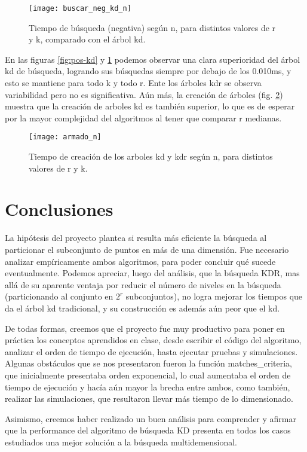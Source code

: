 \begin{figure}
  \begin{center}
  \texttt{[image: buscar\_neg\_kd\_n]}
  \caption{Tiempo de búsqueda (negativa)
    según n, para distintos valores de r y k, comparado con el árbol kd.}
  \label{fig:neg-kd}
  \end{center}
\end{figure}


En las figuras \ref{fig:pos-kd} y \ref{fig:neg-kd} podemos observar
una clara superioridad del árbol kd de búsqueda, logrando sus
búsquedas siempre por debajo de los 0.010ms, y esto se mantiene para
todo k y todo r. Ente los árboles kdr se observa variabilidad pero no
es significativa. Aún más, la creación de árboles
(fig. \ref{fig:armado}) muestra que la creación de arboles kd es
también superior, lo que es de esperar por la mayor complejidad del
algoritmos al tener que comparar r medianas.


\begin{figure}
  \begin{center}
  \texttt{[image: armado\_n]}
  \caption{Tiempo de creación de los arboles kd y kdr
    según n, para distintos valores de r y k.}
  \label{fig:armado}
  \end{center}
\end{figure}

\section{Conclusiones}
La hipótesis del proyecto plantea si resulta más eficiente la
búsqueda al particionar el subconjunto de puntos en más de una
dimensión.
Fue necesario analizar empíricamente ambos algoritmos, para poder
concluir qué sucede eventualmente.
Podemos apreciar, luego del análisis, que la búsqueda KDR,
mas allá de su aparente ventaja por reducir el número de niveles en la
búsqueda (particionando al conjunto en \(2^r\) subconjuntos), no logra
mejorar los tiempos que da el árbol kd tradicional,
y su construcción es además aún peor que el kd.

De todas formas, creemos que el proyecto fue muy productivo para poner
en práctica los conceptos aprendidos en clase, desde escribir el
código del algoritmo,  
analizar el orden de tiempo de ejecución, hasta ejecutar pruebas y
simulaciones.
Algunas obstáculos que se nos presentaron fueron la función
matches\_criteria, que inicialmente presentaba orden exponencial, lo
cual aumentaba el orden de tiempo de ejecución y hacía aún mayor la
brecha entre ambos,
como también, realizar las simulaciones, que resultaron llevar más
tiempo de lo dimensionado.

Asimismo, creemos haber realizado un buen análisis para comprender y
afirmar que la performance del algoritmo de búsqueda KD presenta
en todos los casos estudiados una mejor solución a la búsqueda multidemensional.
